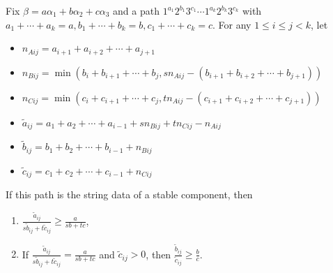 \documentclass[10pt,a4paper]{amsart}
\begin{document}
\begin{Theorem} \label{th:cond2}
Fix  $\beta= a\alpha_1+b\alpha_2+c \alpha_3$ and a path $1^{a_1}2^{b_1} 3^{c_1} \cdots 1^{a_k}2^{b_k}3^{c_k}$ with
$a_1+\cdots + a_k=a, b_1+\cdots + b_k=b, c_1+\cdots + c_k=c.$ For any  
 $ 1\leq i \leq j < k$, let
\begin{itemize}
    \item $n_{Aij}=a_{i+1}+a_{i+2}+\cdots+a_{j+1}$
    \item $n_{Bij}=\min(b_i+b_{i+1}+\cdots+b_{j},sn_{Aij}-(b_{i+1}+b_{i+2}+\cdots+b_{j+1}))$
    \item $n_{Cij}=\min(c_i+c_{i+1}+\cdots+c_{j}, tn_{Aij}-(c_{i+1}+c_{i+2}+\cdots+c_{j+1}))$
    \vspace{.25cm} 
    \item $\tilde a_{ij}=a_1+a_2+\cdots+a_{i-1}+sn_{Bij}+tn_{Cij}-n_{Aij}$
    \item $\tilde b_{ij}=b_1+b_2+\cdots+b_{i-1} + n_{Bij} $
    \item $\tilde c_{ij}=c_1+c_2+\cdots+c_{i-1}+ n_{Cij}$
\end{itemize}
If this path is the string data of a stable component, then 
\begin{enumerate}
    \item $\frac{\tilde a_{ij}}{s\tilde b_{ij}+t\tilde c_{ij}} \geq \frac{a}{sb+tc}$,
    \item If $\frac{\tilde a_{ij}}{s\tilde b_{ij}+t\tilde c_{ij}} = \frac{a}{sb+tc}$ and $\tilde c_{ij}>0$, then $\frac{\tilde b_{ij}}{\tilde c_{ij}} \geq \frac{b}{c}$.
\end{enumerate}
\end{Theorem}
\end{document}
